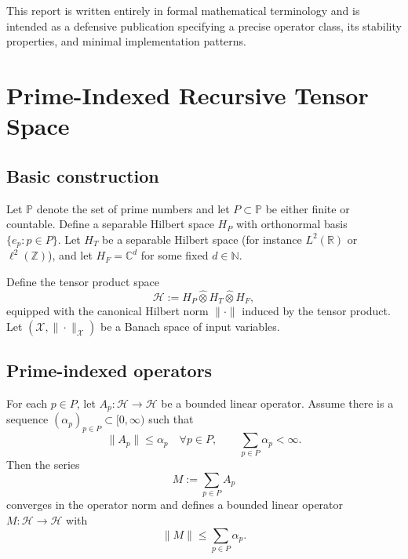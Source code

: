 \documentclass[11pt]{article}
\begin{document}
This report is written entirely in formal mathematical terminology and is intended as a defensive publication specifying a precise operator class, its stability properties, and minimal implementation patterns.

\section{Prime-Indexed Recursive Tensor Space}

\subsection{Basic construction}

Let $\mathbb{P}$ denote the set of prime numbers and let $P \subset \mathbb{P}$ be either finite or countable. Define a separable Hilbert space $H_P$ with orthonormal basis $\{ e_p : p \in P \}$. Let $H_T$ be a separable Hilbert space (for instance $L^2(\mathbb{R})$ or $\ell^2(\mathbb{Z})$), and let $H_F = \mathbb{C}^d$ for some fixed $d \in \mathbb{N}$.

Define the tensor product space
\begin{equation}
  \mathcal{H} := H_P \widehat{\otimes} H_T \widehat{\otimes} H_F,
\end{equation}
equipped with the canonical Hilbert norm $\|\cdot\|$ induced by the tensor product. Let $(\mathcal{X}, \|\cdot\|_{\mathcal{X}})$ be a Banach space of input variables.

\subsection{Prime-indexed operators}

For each $p \in P$, let $A_p : \mathcal{H} \to \mathcal{H}$ be a bounded linear operator. Assume there is a sequence $(\alpha_p)_{p \in P} \subset [0,\infty)$ such that
\begin{equation}
  \|A_p\| \leq \alpha_p \quad \forall p \in P,
  \qquad
  \sum_{p \in P} \alpha_p < \infty.
\end{equation}
Then the series
\begin{equation}
  M := \sum_{p \in P} A_p
\end{equation}
converges in the operator norm and defines a bounded linear operator $M : \mathcal{H} \to \mathcal{H}$ with
\begin{equation}
  \|M\| \leq \sum_{p \in P} \alpha_p.
\end{equation}
\end{document}
